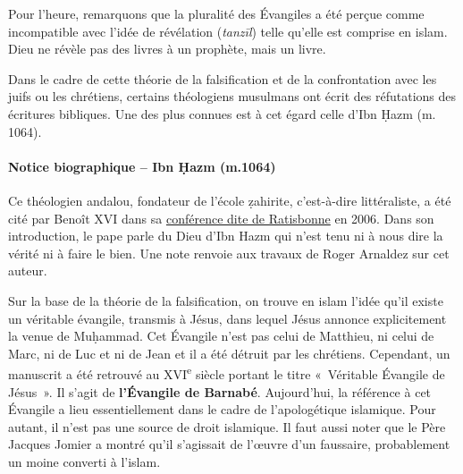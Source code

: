 Pour l'heure, remarquons que la pluralité des Évangiles a été perçue
comme incompatible avec l'idée de révélation (\emph{tanzīl}) telle
qu'elle est comprise en islam. Dieu ne révèle pas des livres à un
prophète, mais un livre.

Dans le cadre de cette théorie de la falsification et de la
confrontation avec les juifs ou les chrétiens, certains théologiens
musulmans ont écrit des réfutations des écritures bibliques. Une des
plus connues est à cet égard celle d'Ibn Ḥazm (m. 1064).

\paragraph{Notice biographique -- Ibn Ḥazm (m.1064)}

Ce théologien andalou, fondateur de l'école ẓahirite, c'est-à-dire
littéraliste, a été cité par Benoît XVI dans sa
\href{http://w2.vatican.va/content/benedict-xvi/fr/speeches/2006/september/documents/hf\_ben-xvi\_spe_20060912\_university-regensburg.html}{conférence
dite de Ratisbonne} en 2006. Dans son introduction, le pape parle du
Dieu d'Ibn Hazm qui n'est tenu ni à nous dire la vérité ni à faire le
bien. Une note renvoie aux travaux de Roger Arnaldez sur cet auteur.



Sur la base de la théorie de la falsification, on trouve en islam l'idée
qu'il existe un véritable évangile, transmis à Jésus, dans lequel Jésus
annonce explicitement la venue de Muḥammad. Cet Évangile n'est pas celui
de Matthieu, ni celui de Marc, ni de Luc et ni de Jean et il a été
détruit par les chrétiens. Cependant, un manuscrit a été retrouvé au
XVI\textsuperscript{e} siècle portant le titre «~Véritable Évangile de
Jésus~». Il s'agit de \textbf{l'Évangile de Barnabé}. Aujourd'hui, la
référence à cet Évangile a lieu essentiellement dans le cadre de
l'apologétique islamique. Pour autant, il n'est pas une source de droit
islamique. Il faut aussi noter que le Père Jacques Jomier a montré qu'il
s'agissait de l'œuvre d'un faussaire, probablement un moine converti à
l'islam.


